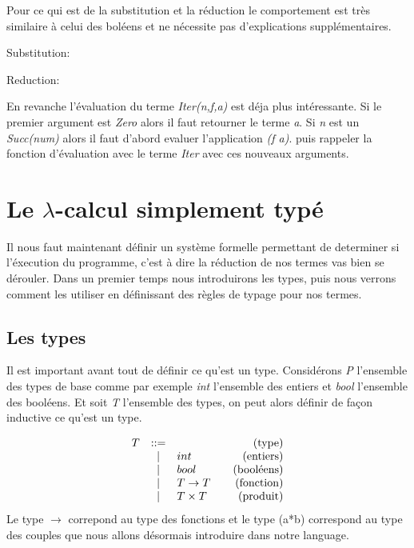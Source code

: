 \documentclass {article}
\makeatletter
\newcommand{\codefrom}[3]
           {}
\theoremstyle{definition}
\theoremstyle{remark}
\newenvironment{bnf}
               {\[\begin{array}{lcl@{\qquad}r}}
               {\end{array}\]}
\makeatother
\begin{document}
Pour ce qui est de la substitution et la réduction le comportement est très
similaire à celui des boléens et ne nécessite pas d'explications supplémentaires.

Substitution:

\codefrom{untyped}{lambda}{nat_substitution}

Reduction:

\codefrom{untyped}{lambda}{nat_reduction}

En revanche l'évaluation du terme \emph{Iter(n,f,a)} est déja plus intéressante.
Si le premier argument est \emph{Zero} alors il faut retourner le terme \emph{a}.
Si \emph{n} est un \emph{Succ(num)} alors il faut d'abord evaluer l'application 
\emph{(f a)}. puis rappeler la fonction d'évaluation avec le terme 
\emph{Iter} avec ces nouveaux arguments.

\codefrom{untyped}{lambda}{nat_evaluation}

\section{Le $\lambda$-calcul simplement typé}

Il nous faut maintenant définir un système formelle permettant de determiner si l'éxecution du programme,
c'est à dire la réduction de nos termes vas bien se dérouler. Dans un premier temps nous introduirons les 
types, puis nous verrons comment les utiliser en définissant des règles de typage pour nos termes.

\subsection{Les types}
\label{simple_type}

Il est important avant tout de définir ce qu'est un type.
Considérons \emph{P} l'ensemble des types de base comme par exemple 
\emph{int} l'ensemble des entiers et \emph{bool} l'ensemble des booléens.
Et soit \emph{T} l'ensemble des types, on peut alors définir de façon inductive
ce qu'est un type.

\begin{bnf}
  T &::=& &\mbox{(type)}\\
  &|&int &\mbox{(entiers)}\\ 
  &|&bool &\mbox{(booléens)}\\
  &|&T \rightarrow T &\mbox{(fonction)}\\
  &|&T \times T &\mbox{(produit)}\\
\end{bnf}
Le type \(\rightarrow\) correpond au type des fonctions et le type (a*b)
correspond au type des couples que nous allons désormais introduire dans notre language.
\end{document}
